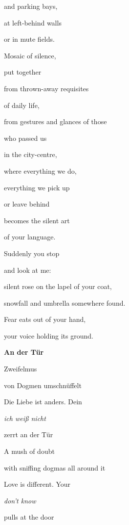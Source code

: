 and parking bays, 


\bigskip

at left-behind walls

or in mute fields.

Mosaic of silence, 

put together


\bigskip

from thrown-away requisites 

of daily life, 

from gestures and glances of those

who passed us


\bigskip

in the city-centre, 

where everything we do,

everything we pick up 

or leave behind


\bigskip

becomes the silent art

of your language. 

Suddenly you stop 

and look at me:


\bigskip

silent rose on the lapel of your coat,

snowfall and umbrella somewhere found.

Fear eats out of your hand,

your voice holding its ground.

\clearpage
\bigskip


\bigskip

{\bfseries
An der Tür}


\bigskip

Zweifelmus

von Dogmen umschnüffelt

Die Liebe ist anders. Dein

\emph{
ich weiß nicht}

zerrt an der Tür



\bigskip

A mush of doubt

with sniffing dogmas all around it

Love is different. Your

\emph{
don't know}

pulls at the door



